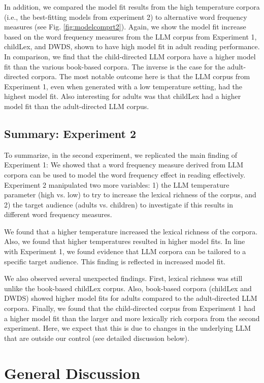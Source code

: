 \documentclass[doc, a4paper]{apa7}
\begin{document}
In addition, we compared the model fit results from the high temperature corpora (i.e., the best-fitting models from experiment 2) to alternative word frequency measures (see Fig. \ref{fig:modelcomprt2}). Again, we show the model fit increase based on the word frequency measures from the LLM corpus from Experiment 1, childLex, and DWDS, shown to have high model fit in adult reading performance. In comparison, we find that the child-directed LLM corpora have a higher model fit than the various book-based corpora. The inverse is the case for the adult-directed corpora. The most notable outcome here is that the LLM corpus from Experiment 1, even when generated with a low temperature setting, had the highest model fit. Also interesting for adults was that childLex had a higher model fit than the adult-directed LLM corpus. 


\subsection*{Summary: Experiment 2}

To summarize, in the second experiment, we replicated the main finding of Experiment 1: We showed that a word frequency measure derived from LLM corpora can be used to model the word frequency effect in reading effectively. Experiment 2 manipulated two more variables: 1) the LLM temperature parameter (high vs. low) to try to increase the lexical richness of the corpus, and 2) the target audience (adults vs. children) to investigate if this results in different word frequency measures. 

We found that a higher temperature increased the lexical richness of the corpora. Also, we found that higher temperatures resulted in higher model fits. In line with Experiment 1, we found evidence that LLM corpora can be tailored to a specific target audience. This finding is reflected in increased model fit.

We also observed several unexpected findings. First, lexical richness was still unlike the book-based childLex corpus. Also, book-based corpora (childLex and DWDS) showed higher model fits for adults compared to the adult-directed LLM corpora. Finally, we found that the child-directed corpus from Experiment 1 had a higher model fit than the larger and more lexically rich corpora from the second experiment. Here, we expect that this is due to changes in the underlying LLM that are outside our control (see detailed discussion below).


\section*{General Discussion}
\end{document}
